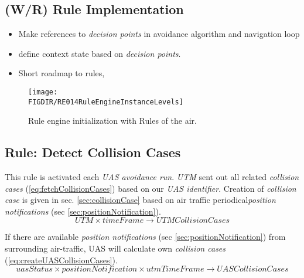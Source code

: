 \setcounter{chapter}{5}
\setcounter{section}{7}
\subsection{(W/R) Rule Implementation}\label{sec:ruleImplementation}
\begin{itemize}
    \item Make references to \emph{decision points} in avoidance algorithm and navigation loop
    \item define context state based on \emph{decision points}.
    \item Short roadmap to rules,
\end{itemize}
\begin{figure}[H]
    \centering
    \texttt{[image: \\FIGDIR/RE014RuleEngineInstanceLevels]} 
    \caption{Rule engine initialization with Rules of the air.}
    \label{fig:RuleEngineInstanceLevels}
\end{figure}

\subsection{Rule: Detect Collision Cases}
    \noindent This rule is activated each \emph{UAS avoidance run}. \emph{UTM} sent out all related \emph{collision cases} (\ref{eq:fetchCollisionCases}) based on our \emph{UAS identifier}. Creation of \emph{collision case} is given in sec. \ref{sec:collisionCase} based on air traffic periodical\emph{position notifications} (sec \ref{sec:positionNotification}).
    \begin{equation}\label{eq:fetchCollisionCases}
        UTM\times timeFrame \to UTMCollisionCases
    \end{equation}
    
    If there are available \emph{position notifications} (sec \ref{sec:positionNotification}) from surrounding air-traffic, UAS will calculate own \emph{collision cases} (\ref{eq:createUASCollisionCases}).
    \begin{equation}\label{eq:createUASCollisionCases}
        uasStatus\times positionNotification\times utmTimeFrame\to UASCollisionCases
    \end{equation}
    
